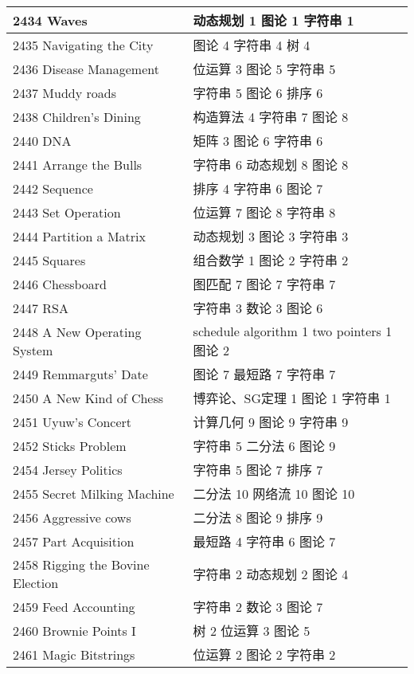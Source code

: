 \begin{longtable}{| p{} | p{} |}
 2434 Waves  & 动态规划 1 图论 1 字符串 1 \\ \hline
 2435 Navigating the City  & 图论 4 字符串 4 树 4 \\ \hline
 2436 Disease Management  & 位运算 3 图论 5 字符串 5 \\ \hline
 2437 Muddy roads  & 字符串 5 图论 6 排序 6 \\ \hline
 2438 Children's Dining  & 构造算法 4 字符串 7 图论 8 \\ \hline
 2440 DNA  & 矩阵 3 图论 6 字符串 6 \\ \hline
 2441 Arrange the Bulls  & 字符串 6 动态规划 8 图论 8 \\ \hline
 2442 Sequence  & 排序 4 字符串 6 图论 7 \\ \hline
 2443 Set Operation  & 位运算 7 图论 8 字符串 8 \\ \hline
 2444 Partition a Matrix  & 动态规划 3 图论 3 字符串 3 \\ \hline
 2445 Squares  & 组合数学 1 图论 2 字符串 2 \\ \hline
 2446 Chessboard  & 图匹配 7 图论 7 字符串 7 \\ \hline
 2447 RSA  & 字符串 3 数论 3 图论 6 \\ \hline
 2448 A New Operating System  & schedule algorithm 1 two pointers 1 图论 2 \\ \hline
 2449 Remmarguts' Date  & 图论 7 最短路 7 字符串 7 \\ \hline
 2450 A New Kind of Chess  & 博弈论、SG定理 1 图论 1 字符串 1 \\ \hline
 2451 Uyuw's Concert  & 计算几何 9 图论 9 字符串 9 \\ \hline
 2452 Sticks Problem  & 字符串 5 二分法 6 图论 9 \\ \hline
 2454 Jersey Politics  & 字符串 5 图论 7 排序 7 \\ \hline
 2455 Secret Milking Machine  & 二分法 10 网络流 10 图论 10 \\ \hline
 2456 Aggressive cows  & 二分法 8 图论 9 排序 9 \\ \hline
 2457 Part Acquisition  & 最短路 4 字符串 6 图论 7 \\ \hline
 2458 Rigging the Bovine Election  & 字符串 2 动态规划 2 图论 4 \\ \hline
 2459 Feed Accounting  & 字符串 2 数论 3 图论 7 \\ \hline
 2460 Brownie Points I  & 树 2 位运算 3 图论 5 \\ \hline
 2461 Magic Bitstrings  & 位运算 2 图论 2 字符串 2 \\ \hline

\end{longtable}
